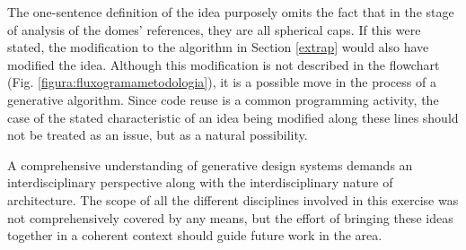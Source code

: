 \documentclass[preprint,12pt,3p]{elsarticle}
\begin{document}
The one-sentence definition of the idea purposely omits the fact that in the stage of analysis of the domes' references, they are all spherical caps. If this were stated, the modification to the algorithm in Section \ref{extrap} would also have modified the idea. Although this modification is not described in the flowchart (Fig. \ref{figura:fluxogramametodologia}), it is a possible move in the process of a generative algorithm. Since code reuse is a common programming activity, the case of the stated characteristic of an idea being modified along these lines should not be treated as an issue, but as a natural possibility. 

A comprehensive understanding of generative design systems demands an interdisciplinary perspective along with the interdisciplinary nature of architecture. The scope of all the different disciplines involved in this exercise was not comprehensively covered by any means, but the effort of bringing these ideas together in a coherent context should guide future work in the area.









% 
% 
% 
% 
% 
% 
% 
% 
% 
% 
% 
% 


\end{document}
